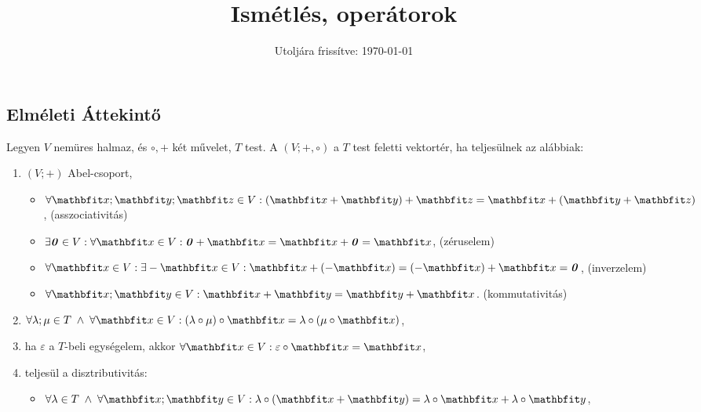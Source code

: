 \documentclass{szb-practice}
\title{Ismétlés, operátorok}
\date{Utoljára frissítve: \today}
\begin{document}
\maketitle

\vspace{-1em}
\subsection{Elméleti Áttekintő}
\vspace{1em}

\begin{definition}[Vektortér]
  Legyen $V$ nemüres halmaz, és $\circ, +$ két művelet, $T$ test.
  A $(V; +, \circ)$ a $T$ test feletti vektortér, ha teljesülnek az alábbiak:
  \begin{enumerate}[itemsep=-.33em]
    \item $(V; +)$ Abel-csoport,
          \begin{itemize}[itemsep=-.33em]
            \item $\forall \rvec x; \rvec y; \rvec z \in V:
                    (\rvec x + \rvec y) + \rvec z
                    = \rvec x + (\rvec y + \rvec z)$,
                  \hfill (asszociativitás)

            \item $\exists \nvec \in V: \forall \rvec x \in V:
                    \nvec + \rvec x = \rvec x + \nvec = \rvec x$,
                  \hfill (zéruselem)

            \item $\forall \rvec x \in V: \exists -\rvec x \in V:
                    \rvec x + (-\rvec x) = (-\rvec x) + \rvec x = \nvec$,
                  \hfill (inverzelem)

            \item $\forall \rvec x; \rvec y \in V:
                    \rvec x + \rvec y = \rvec y + \rvec x$.
                  \hfill (kommutativitás)
          \end{itemize}

    \item $\forall \lambda; \mu \in T \; \land \; \forall \rvec x \in V:
            (\lambda \circ \mu) \circ \rvec x
            = \lambda \circ (\mu \circ \rvec x)$,

    \item ha $\varepsilon$ a $T$-beli egységelem, akkor
          $\forall \rvec x \in V: \varepsilon \circ \rvec x = \rvec x$,

    \item teljesül a disztributivitás:
          \begin{itemize}[itemsep=-.33em]
            \item $\forall \lambda \in T \; \land \; \forall \rvec x; \rvec y \in V:
                    \lambda \circ (\rvec x + \rvec y)
                    = \lambda \circ \rvec x + \lambda \circ \rvec y$,


\end{itemize}
\end{enumerate}
\end{definition}
\end{document}
